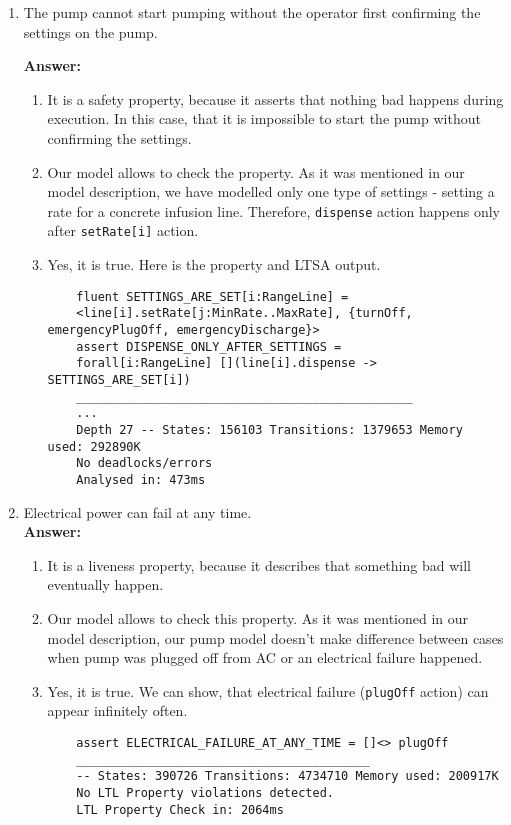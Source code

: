 \documentclass{article}
\begin{document}
\begin{enumerate}
    \item The pump cannot start pumping without the operator first confirming the settings on the pump.
    
    \textbf{Answer:}
    \begin{enumerate}
    \item It is a safety property, because it asserts that nothing bad happens during execution. In this case, that it is
    impossible to start the pump without confirming the settings.
    \item  Our model allows to check the property. As it was mentioned in our model description, we have modelled only one
    type of settings - setting a rate for a concrete infusion line. Therefore, \verb|dispense| action happens only after
    \verb|setRate[i]| action.
    \item Yes, it is true. Here is the property and LTSA output.
	\begin{verbatim}
	fluent SETTINGS_ARE_SET[i:RangeLine] = 
	<line[i].setRate[j:MinRate..MaxRate], {turnOff, emergencyPlugOff, emergencyDischarge}>
	assert DISPENSE_ONLY_AFTER_SETTINGS = 
	forall[i:RangeLine] [](line[i].dispense -> SETTINGS_ARE_SET[i])
	_______________________________________________
	...
	Depth 27 -- States: 156103 Transitions: 1379653 Memory used: 292890K
	No deadlocks/errors
	Analysed in: 473ms
	\end{verbatim}    
    \end{enumerate}
    
    \item Electrical power can fail at any time.\\
    \textbf{Answer:}
    \begin{enumerate}
    \item It is a liveness property, because it describes that something bad will eventually happen.
    \item Our model allows to check this property. As it was mentioned in our model description, our pump model doesn't make
    difference between cases when pump was plugged off from AC or an electrical failure happened.
    \item Yes, it is true. We can show, that electrical failure (\verb|plugOff| action) can appear infinitely often.
    \begin{verbatim}
    assert ELECTRICAL_FAILURE_AT_ANY_TIME = []<> plugOff
    _________________________________________
    -- States: 390726 Transitions: 4734710 Memory used: 200917K
    No LTL Property violations detected.
    LTL Property Check in: 2064ms
    \end{verbatim}
    \end{enumerate}
     


\end{enumerate}
\end{document}
